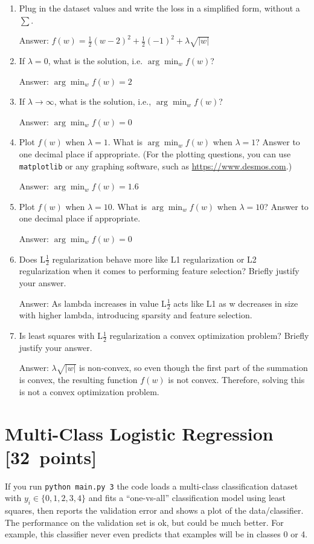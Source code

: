 \documentclass{article}
\newcommand{\blu}[1]{{\textcolor{blu}{#1}}}
\newcommand{\gre}[1]{\textcolor{gre}{#1}}
\newcommand\ans[1]{\par\gre{Answer: #1}}
\let\ask\blu
\newcommand\pts[1]{\textcolor{pointscolour}{[#1~points]}}
\begin{document}
\begin{enumerate}
\item \ask{Plug in the dataset values and write the loss in a simplified form, without a $\sum$.}
\ans{$f(w) = \frac{1}{2}(w-2)^2 + \frac{1}{2}(-1)^2+\lambda\sqrt{|w|}$}

\item \ask{If $\lambda=0$, what is the solution, i.e. $\arg \min_w f(w)$?}
\ans{$\arg \min_w f(w) = 2$}

\item \ask{If $\lambda\rightarrow \infty$, what is the solution, i.e., $\arg \min_w f(w)$?}
\ans{$\arg \min_w f(w) = 0$}

\item \ask{Plot $f(w)$ when $\lambda = 1$. What is $\arg \min_w f(w)$ when $\lambda=1$?} Answer to one decimal place if appropriate. (For the plotting questions, you can use \texttt{matplotlib} or any graphing software, such as \url{https://www.desmos.com}.)
\ans{$\arg \min_w f(w) = 1.6$}

\item \ask{Plot $f(w)$ when $\lambda = 10$. What is $\arg \min_w f(w)$ when $\lambda=10$?} Answer to one decimal place if appropriate.
\ans{$\arg \min_w f(w) = 0$}

\item \ask{Does L$\frac12$ regularization behave more like L1 regularization or L2 regularization
when it comes to performing feature selection?} Briefly justify your answer.
\ans{As lambda increases in value L$\frac{1}{2}$ acts like L1 as w decreases in size with higher lambda, introducing sparsity and feature selection. }

\item \ask{Is least squares with L$\frac12$ regularization
a convex optimization problem?} Briefly justify your answer.
\ans{$\lambda\sqrt{|w|}$ is non-convex, so even though the first part of the summation is convex, the resulting function $f(w)$ is not convex. Therefore, solving this is not a convex optimization problem.}

\end{enumerate}

\clearpage
\section{Multi-Class Logistic Regression \pts{32}}

If you run \verb|python main.py 3| the code loads a multi-class
classification dataset with $y_i \in \{0,1,2,3,4\}$ and fits a ``one-vs-all'' classification
model using least squares, then reports the validation error and shows a plot of the data/classifier.
The performance on the validation set is ok, but could be much better.
For example, this classifier never even predicts that examples will be in classes 0 or 4.
\end{document}
